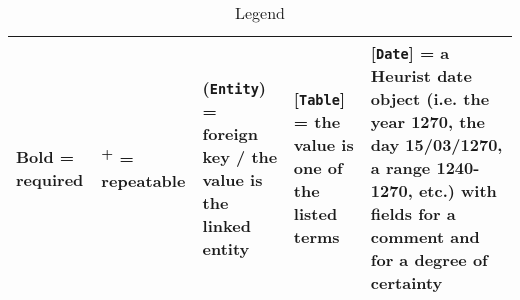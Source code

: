 \documentclass[a3paper, landscape]{report}
\begin{document}

    \vspace*{1em}

    \begin{center}
        
    \end{center}

    \begin{table}[b]
        \caption*{Legend}
        \begin{tabularx}{\textwidth}{|l|l|l|l|X|}
        \hline
        \footnotesize{\textbf{Bold} = required}
        & \footnotesize{\textsuperscript{+} = repeatable}
        & \footnotesize{(\texttt{Entity}) = foreign key / the value is the linked entity}
        & \footnotesize{[\texttt{Table}]} = the value is one of the listed terms
        & \footnotesize{[\texttt{Date}] = a Heurist date object (i.e. the year 1270, the day 15/03/1270, a range 1240-1270, etc.) with fields for a comment and for a degree of certainty}\\
        \hline
    \end{tabularx}
    \end{table}
\end{document}
